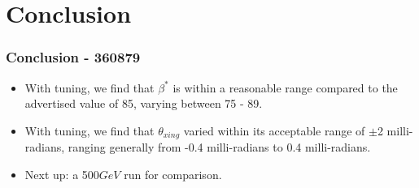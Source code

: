 \section{Conclusion}
\label{sec:conclusion}
\begin{frame}
  \frametitle{Conclusion - 360879}
  \begin{itemize}
    \item With tuning, we find that $\beta^*$ is within a reasonable range
      compared to the advertised value of 85, varying between 75 - 89. 
    \item With tuning, we find that $\theta_{xing}$ varied within its acceptable
      range of $\pm$2 milli-radians, ranging generally from -0.4 milli-radians
      to 0.4 milli-radians.
    \item Next up: a 500$GeV$ run for comparison. 
  \end{itemize}
\end{frame}
